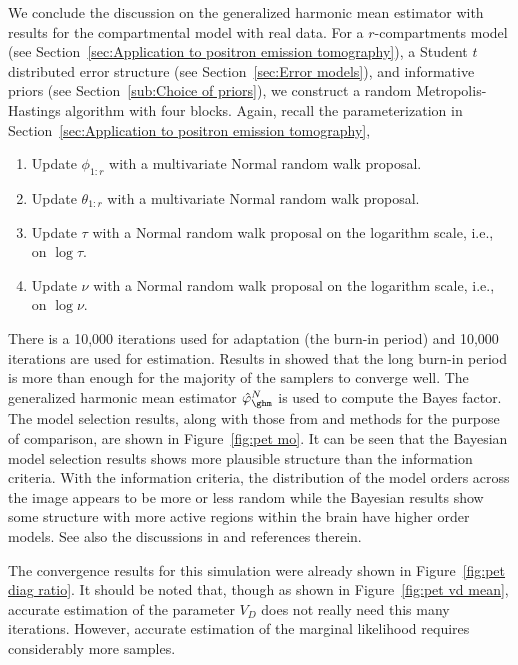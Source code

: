 We conclude the discussion on the generalized harmonic mean estimator with results for the \pet compartmental model with real data. For a $r$-compartments \pet model (see Section~\ref{sec:Application to positron emission tomography}), a Student $t$ distributed error structure (see Section~\ref{sec:Error models}), and informative priors (see Section~\ref{sub:Choice of priors}), we construct a random Metropolis-Hastings algorithm with four blocks. Again, recall the parameterization in Section~\ref{sec:Application to positron emission tomography},
\begin{enumerate}
  \item Update $\phi_{1:r}$ with a multivariate Normal random walk proposal.
  \item Update $\theta_{1:r}$ with a multivariate Normal random walk proposal.
  \item Update $\tau$ with a Normal random walk proposal on the logarithm
    scale, i.e., on $\log\tau$.
  \item Update $\nu$ with a Normal random walk proposal on the logarithm
    scale, i.e., on $\log\nu$.
\end{enumerate}
There is a 10,000 iterations used for adaptation (the burn-in period) and 10,000 iterations are used for estimation. Results in \cite{Zhou2013} showed that the long burn-in period is more than enough for the majority of the samplers to converge well. The generalized harmonic mean estimator $\hat\varphi_{\ghm}^N$ is used to compute the Bayes factor. The model selection results, along with those from \aic and \bic methods for the purpose of comparison, are shown in Figure~\ref{fig:pet mo}. It can be seen that the Bayesian model selection results shows more plausible structure than the information criteria. With the information criteria, the distribution of the model orders across the image appears to be more or less random while the Bayesian results show some structure with more active regions within the brain have higher order models. See also the discussions in \cite{Zhou2013} and references therein.

\afterpage{\clearpage}

The convergence results for this simulation were already shown in Figure~\ref{fig:pet diag ratio}. It should be noted that, though as shown in Figure~\ref{fig:pet vd mean}, accurate estimation of the parameter $V_D$ does not really need this many iterations. However, accurate estimation of the marginal likelihood requires considerably more samples.

